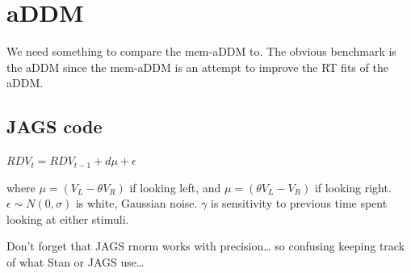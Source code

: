 \documentclass[
]{book}
\begin{document}
\hypertarget{addm}{%
\section{aDDM}\label{addm}}

We need something to compare the mem-aDDM to. The obvious benchmark is the aDDM since the mem-aDDM is an attempt to improve the RT fits of the aDDM.

\hypertarget{jags-code-1}{%
\subsection{JAGS code}\label{jags-code-1}}

\(RDV_t = RDV_{t-1} + d\mu+\epsilon\)

where \(\mu=(V_L-\theta V_R)\) if looking left, and \(\mu=(\theta V_L-V_R)\) if looking right. \(\epsilon \sim N(0,\sigma)\) is white, Gaussian noise. \(\gamma\) is sensitivity to previous time spent looking at either stimuli.

Don't forget that JAGS rnorm works with precision\ldots{} so confusing keeping track of what Stan or JAGS use\ldots{}
\end{document}
